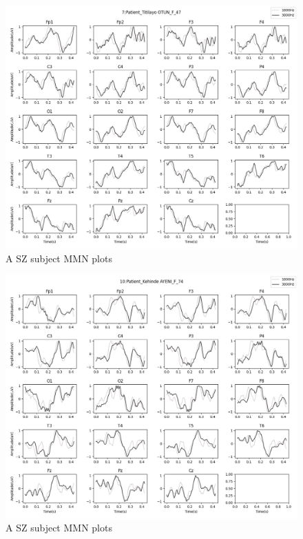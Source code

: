 \documentclass[10pt]{article}
\begin{document}
\begin{figure}[H]
  \includegraphics[width=16cm]{../../../data_analysis_results/MMN/time_series/Patient/7.png}
  \caption{A SZ subject MMN plots}
\end{figure}
\begin{figure}[H]
  \includegraphics[width=16cm]{../../../data_analysis_results/MMN/time_series/Patient/10.png}
  \caption{A SZ subject MMN plots}
\end{figure}
\end{document}
